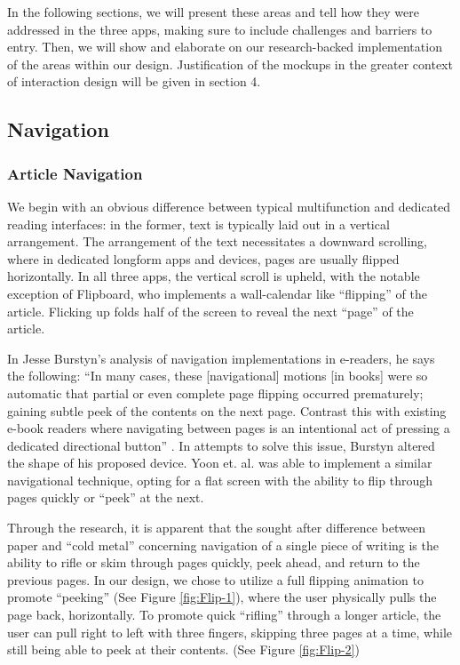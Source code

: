 \documentclass[11pt, oneside]{article}   	%
\begin{document}
In the following sections, we will present these areas and tell how they were addressed in the three apps, making sure to include challenges and barriers to entry. Then, we will show and elaborate on our research-backed implementation of the areas within our design. Justification of the mockups in the greater context of interaction design will be given in section 4.

\subsection{Navigation}

\subsubsection{Article Navigation}
We begin with an obvious difference between typical multifunction and dedicated reading interfaces: in the former, text is typically laid out in a vertical arrangement. The arrangement of the text necessitates a downward scrolling, where in dedicated longform apps and devices, pages are usually flipped horizontally. In all three apps, the vertical scroll is upheld, with the notable exception of Flipboard, who implements a wall-calendar like ``flipping'' of the article. Flicking up folds half of the screen to reveal the next ``page'' of the article. 

In Jesse Burstyn's analysis of navigation implementations in e-readers, he says the following: ``In many cases, these [navigational] motions [in books] were so automatic that partial or even complete page flipping occurred prematurely; gaining subtle peek of the contents on the next page. Contrast this with existing e-book readers where navigating between pages is an intentional act of pressing a dedicated directional button'' \cite{Burstyn}. In attempts to solve this issue, Burstyn altered the shape of his proposed device. Yoon et. al. was able to implement a similar navigational technique, opting for a flat screen with the ability to flip through pages quickly or ``peek'' at the next.

Through the research, it is apparent that the sought after difference between paper and ``cold metal'' concerning navigation of a single piece of writing is the ability to rifle or skim through pages quickly, peek ahead, and return to the previous pages. In our design, we chose to utilize a full flipping animation to promote ``peeking'' (See Figure \ref{fig:Flip-1}), where the user physically pulls the page back, horizontally. To promote quick ``rifling'' through a longer article, the user can pull right to left with three fingers, skipping three pages at a time, while still being able to peek at their contents. (See Figure \ref{fig:Flip-2})
\end{document}
